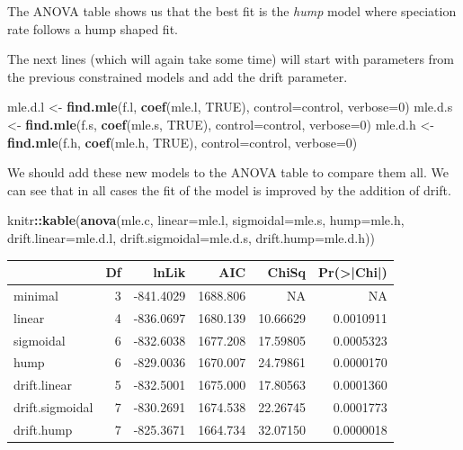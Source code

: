 \documentclass[
]{book}
\newenvironment{Shaded}{\begin{snugshade}}{\end{snugshade}}
\newcommand{\DataTypeTok}[1]{\textcolor[rgb]{0.13,0.29,0.53}{#1}}
\newcommand{\DecValTok}[1]{\textcolor[rgb]{0.00,0.00,0.81}{#1}}
\newcommand{\KeywordTok}[1]{\textcolor[rgb]{0.13,0.29,0.53}{\textbf{#1}}}
\newcommand{\NormalTok}[1]{#1}
\newcommand{\OperatorTok}[1]{\textcolor[rgb]{0.81,0.36,0.00}{\textbf{#1}}}
\newcommand{\OtherTok}[1]{\textcolor[rgb]{0.56,0.35,0.01}{#1}}
\newcommand{\StringTok}[1]{\textcolor[rgb]{0.31,0.60,0.02}{#1}}
\begin{document}
The ANOVA table shows us that the best fit is the \emph{hump} model where speciation rate follows a hump shaped fit.

The next lines (which will again take some time) will start with parameters from the previous constrained models and add the drift parameter.

\begin{Shaded}
\begin{Highlighting}[]
\NormalTok{mle.d.l \textless{}{-}}\StringTok{ }\KeywordTok{find.mle}\NormalTok{(f.l, }\KeywordTok{coef}\NormalTok{(mle.l, }\OtherTok{TRUE}\NormalTok{), }\DataTypeTok{control=}\NormalTok{control, }\DataTypeTok{verbose=}\DecValTok{0}\NormalTok{)}
\NormalTok{mle.d.s \textless{}{-}}\StringTok{ }\KeywordTok{find.mle}\NormalTok{(f.s, }\KeywordTok{coef}\NormalTok{(mle.s, }\OtherTok{TRUE}\NormalTok{), }\DataTypeTok{control=}\NormalTok{control, }\DataTypeTok{verbose=}\DecValTok{0}\NormalTok{)}
\NormalTok{mle.d.h \textless{}{-}}\StringTok{ }\KeywordTok{find.mle}\NormalTok{(f.h, }\KeywordTok{coef}\NormalTok{(mle.h, }\OtherTok{TRUE}\NormalTok{), }\DataTypeTok{control=}\NormalTok{control, }\DataTypeTok{verbose=}\DecValTok{0}\NormalTok{)}
\end{Highlighting}
\end{Shaded}

We should add these new models to the ANOVA table to compare them all. We can see that in all cases the fit of the model is improved by the addition of drift.

\begin{Shaded}
\begin{Highlighting}[]
\NormalTok{knitr}\OperatorTok{::}\KeywordTok{kable}\NormalTok{(}\KeywordTok{anova}\NormalTok{(mle.c, }\DataTypeTok{linear=}\NormalTok{mle.l, }\DataTypeTok{sigmoidal=}\NormalTok{mle.s, }
                   \DataTypeTok{hump=}\NormalTok{mle.h, }\DataTypeTok{drift.linear=}\NormalTok{mle.d.l, }
                   \DataTypeTok{drift.sigmoidal=}\NormalTok{mle.d.s, }\DataTypeTok{drift.hump=}\NormalTok{mle.d.h))}
\end{Highlighting}
\end{Shaded}

\begin{tabular}{l|r|r|r|r|r}
\hline
  & Df & lnLik & AIC & ChiSq & Pr(>|Chi|)\\
\hline
minimal & 3 & -841.4029 & 1688.806 & NA & NA\\
\hline
linear & 4 & -836.0697 & 1680.139 & 10.66629 & 0.0010911\\
\hline
sigmoidal & 6 & -832.6038 & 1677.208 & 17.59805 & 0.0005323\\
\hline
hump & 6 & -829.0036 & 1670.007 & 24.79861 & 0.0000170\\
\hline
drift.linear & 5 & -832.5001 & 1675.000 & 17.80563 & 0.0001360\\
\hline
drift.sigmoidal & 7 & -830.2691 & 1674.538 & 22.26745 & 0.0001773\\
\hline
drift.hump & 7 & -825.3671 & 1664.734 & 32.07150 & 0.0000018\\
\hline
\end{tabular}
\end{document}
